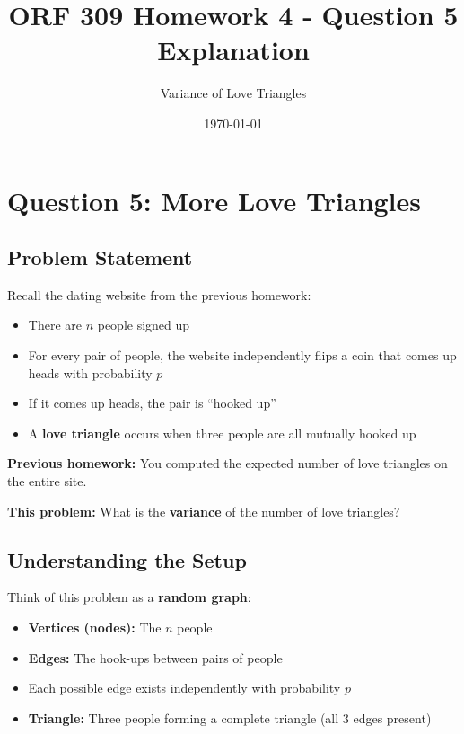 \documentclass[11pt]{article}
\title{ORF 309 Homework 4 - Question 5 Explanation}
\author{Variance of Love Triangles}
\date{\today}
\begin{document}
\maketitle

\section*{Question 5: More Love Triangles}

\subsection*{Problem Statement}

Recall the dating website from the previous homework:
\begin{itemize}[leftmargin=2em]
    \item There are $n$ people signed up
    \item For every pair of people, the website independently flips a coin that comes up heads with probability $p$
    \item If it comes up heads, the pair is ``hooked up''
    \item A \textbf{love triangle} occurs when three people are all mutually hooked up
\end{itemize}

\textbf{Previous homework:} You computed the expected number of love triangles on the entire site.

\textbf{This problem:} What is the \textbf{variance} of the number of love triangles?

\vspace{1em}

\subsection*{Understanding the Setup}

Think of this problem as a \textbf{random graph}:
\begin{itemize}[leftmargin=2em]
    \item \textbf{Vertices (nodes):} The $n$ people
    \item \textbf{Edges:} The hook-ups between pairs of people
    \item Each possible edge exists independently with probability $p$
    \item \textbf{Triangle:} Three people forming a complete triangle (all 3 edges present)
\end{itemize}
\end{document}
